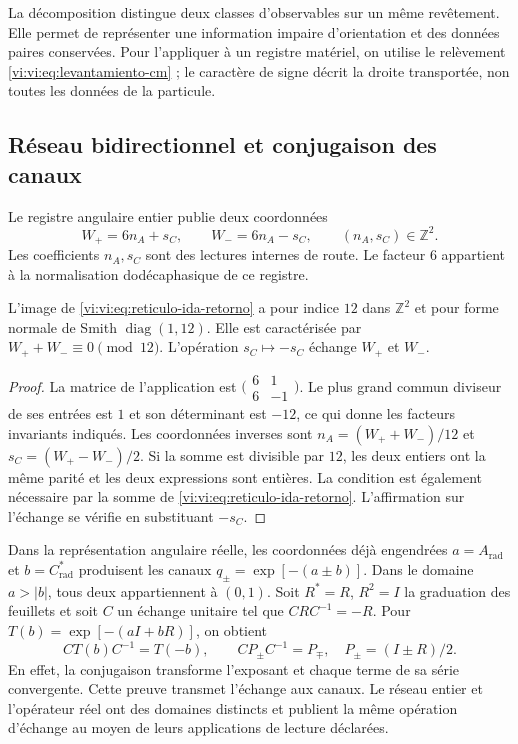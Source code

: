 La décomposition distingue deux classes d’observables sur un
même revêtement. Elle permet de représenter une information impaire d’orientation
et des données paires conservées. Pour l’appliquer à un registre matériel, on
utilise le relèvement \eqref{vi:vi:eq:levantamiento-cm} ; le caractère
de signe décrit la droite transportée, non toutes les données de la
particule.

\subsection{Réseau bidirectionnel et conjugaison des canaux}
\label{vi:vi:subsec:reticulo-bidireccional}

Le registre angulaire entier publie deux coordonnées
\begin{equation}
 W_+=6n_A+s_C,\qquad W_-=6n_A-s_C,
 \qquad (n_A,s_C)\in\mathbb Z^2.
 \label{vi:vi:eq:reticulo-ida-retorno}
\end{equation}
Les coefficients $n_A,s_C$ sont des lectures internes de route. Le facteur
$6$ appartient à la normalisation dodécaphasique de ce registre.

\begin{proposition}
\label{vi:vi:prop:indice-bidireccional}
L’image de \eqref{vi:vi:eq:reticulo-ida-retorno} a pour indice $12$
dans $\mathbb Z^2$ et pour forme normale de Smith $\operatorname{diag}(1,12)$.
Elle est caractérisée par $W_++W_-\equiv0\pmod{12}$. L’opération
$s_C\mapsto-s_C$ échange $W_+$ et $W_-$.
\end{proposition}
\begin{proof}
La matrice de l'application est
$\bigl(\begin{smallmatrix}6&1\\6&-1\end{smallmatrix}\bigr)$.
Le plus grand commun diviseur de ses entrées est $1$ et son déterminant
est $-12$, ce qui donne les facteurs invariants indiqués. Les
coordonnées inverses sont
$n_A=(W_++W_-)/12$ et $s_C=(W_+-W_-)/2$.
Si la somme est divisible par $12$, les deux entiers ont la même
parité et les deux expressions sont entières. La condition est également
nécessaire par la somme de \eqref{vi:vi:eq:reticulo-ida-retorno}.
L’affirmation sur l’échange se vérifie en substituant $-s_C$.
\end{proof}

Dans la représentation angulaire réelle, les coordonnées déjà engendrées
$a=A_{\mathrm{rad}}$ et $b=C^*_{\mathrm{rad}}$ produisent les
canaux $q_\pm=\exp[-(a\pm b)]$. Dans le domaine $a>|b|$, tous deux
appartiennent à $(0,1)$. Soit $R^*=R$, $R^2=I$ la graduation des
feuillets et soit $C$ un échange unitaire tel que $CRC^{-1}=-R$.
Pour $T(b)=\exp[-(aI+bR)]$, on obtient
\begin{equation}
 CT(b)C^{-1}=T(-b),\qquad
 CP_\pm C^{-1}=P_\mp,\quad P_\pm=(I\pm R)/2.
 \label{vi:vi:eq:conjugacion-canales}
\end{equation}
En effet, la conjugaison transforme l’exposant et chaque terme
de sa série convergente. Cette preuve transmet l’échange aux
canaux. Le réseau entier et l’opérateur réel ont des domaines
distincts et publient la même opération d’échange au moyen de
leurs applications de lecture déclarées.

